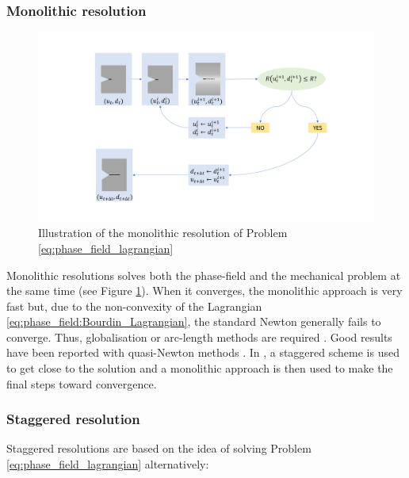 \subsubsection{Monolithic resolution}

\begin{figure}[H]
  \centering
  \includegraphics[width=10.cm]{../chapter_00_introduction/figures/monolithic-resolution.pdf}
  \caption{Illustration of the monolithic resolution of Problem \eqref{eq:phase_field_lagrangian}}
  \label{fig:hho:phase_field:monolithic_scheme}
\end{figure}


Monolithic resolutions solves both the phase-field and the mechanical
problem at the same time (see Figure
\ref{fig:hho:phase_field:monolithic_scheme}). When it converges, the
monolithic approach is very fast but, due to the non-convexity of the
Lagrangian \eqref{eq:phase_field:Bourdin_Lagrangian}, the standard Newton
generally fails to converge. Thus, globalisation or arc-length methods
are required \cite{wick_modified_2017, edf_modelisation_2019}. Good results
have been reported with quasi-Newton methods
\cite{wu_bfgs_2020, wu_comprehensive_2020}. In \cite{farrell_linear_2017}, a
staggered scheme is used to get close to the solution and a monolithic
approach is then used to make the final steps toward convergence.

\subsubsection{Staggered resolution}
\label{sec:phase_field:staggered_resolution}

Staggered resolutions are based on the idea of solving Problem
\eqref{eq:phase_field_lagrangian} alternatively:

